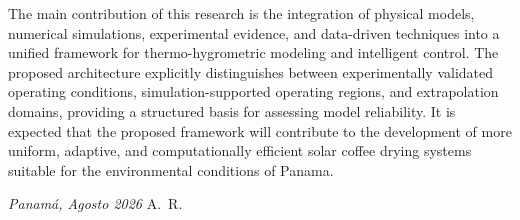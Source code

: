 The main contribution of this research is the integration of physical models, numerical simulations, experimental evidence, and data-driven techniques into a unified framework for thermo-hygrometric modeling and intelligent control. The proposed architecture explicitly distinguishes between experimentally validated operating conditions, simulation-supported operating regions, and extrapolation domains, providing a structured basis for assessing model reliability. It is expected that the proposed framework will contribute to the development of more uniform, adaptive, and computationally efficient solar coffee drying systems suitable for the environmental conditions of Panama.


\bigskip
 
\noindent\textit{Panamá, Agosto 2026}
\hfill A.~R.

